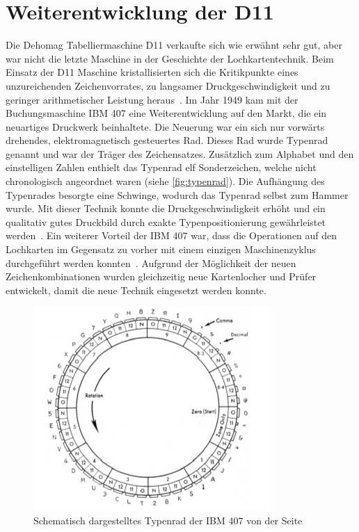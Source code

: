 \documentclass[parskip=half]{scrartcl}
\begin{document}
\section{Weiterentwicklung der D11}

Die Dehomag Tabelliermaschine D11 verkaufte sich wie erwähnt sehr gut, aber war
nicht die letzte Maschine in der Geschichte der Lochkartentechnik. Beim Einsatz
der D11 Maschine kristallisierten sich die Kritikpunkte eines unzureichenden
Zeichenvorrates, zu langsamer Druckgeschwindigkeit und zu geringer
arithmetischer Leistung heraus~\cite{sandner}. Im Jahr 1949 kam mit der
Buchungsmaschine IBM 407 eine Weiterentwicklung auf den Markt, die ein
neuartiges Druckwerk beinhaltete. Die Neuerung war ein sich nur vorwärts
drehendes, elektromagnetisch gesteuertes Rad. Dieses Rad wurde Typenrad genannt
und war der Träger des Zeichensatzes. Zusätzlich zum Alphabet und den
einstelligen Zahlen enthielt das Typenrad elf Sonderzeichen, welche nicht
chronologisch angeordnet waren (siehe \autoref{fig:typenrad}). Die Aufhängung
des Typenrades besorgte eine Schwinge, wodurch das Typenrad selbst zum Hammer
wurde. Mit dieser Technik konnte die Druckgeschwindigkeit erhöht und ein
qualitativ gutes Druckbild durch exakte Typenpositionierung gewährleistet
werden~\cite{sandner}. Ein weiterer Vorteil der IBM 407 war, dass die
Operationen auf den Lochkarten im Gegensatz zu vorher mit einem einzigen
Maschinenzyklus durchgeführt werden konnten~\cite{Boyell}. Aufgrund der
Möglichkeit der neuen Zeichenkombinationen wurden gleichzeitig neue
Kartenlocher und Prüfer entwickelt, damit die neue Technik eingesetzt werden
konnte.

\begin{figure}[h]
  \centering
  \includegraphics{typenrad}
  \caption{Schematisch dargestelltes Typenrad der IBM 407 von der Seite~\cite{sandner}}
  \label{fig:typenrad}
\end{figure}
\end{document}
